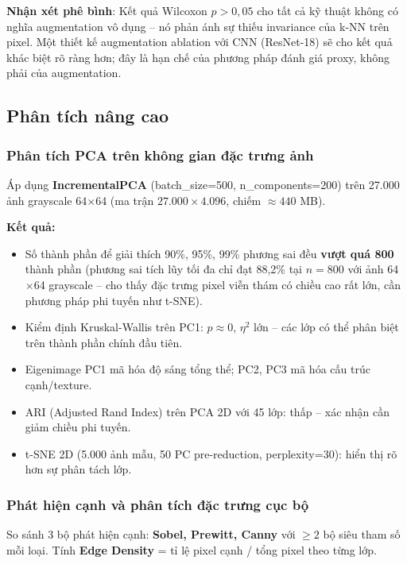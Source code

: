 \documentclass[12pt,a4paper]{article}
\let\oldtextbf\textbf
\renewcommand{\textbf}[1]{\oldtextbf{\textcolor{hcmublue}{#1}}}
\begin{document}
\textbf{Nhận xét phê bình}: Kết quả Wilcoxon $p > 0{,}05$ cho tất cả kỹ thuật không có nghĩa augmentation vô dụng -- nó phản ánh sự thiếu invariance của k-NN trên pixel. Một thiết kế augmentation ablation với CNN (ResNet-18) sẽ cho kết quả khác biệt rõ ràng hơn; đây là hạn chế của phương pháp đánh giá proxy, không phải của augmentation.

\subsection{Phân tích nâng cao}

\subsubsection{Phân tích PCA trên không gian đặc trưng ảnh}

Áp dụng \textbf{IncrementalPCA} (batch\_size=500, n\_components=200) trên 27.000 ảnh grayscale 64$\times$64 (ma trận $27.000 \times 4.096$, chiếm $\approx 440$ MB).

\textbf{Kết quả:}
\begin{itemize}
    \item Số thành phần để giải thích 90\%, 95\%, 99\% phương sai đều \textbf{vượt quá 800} thành phần (phương sai tích lũy tối đa chỉ đạt 88{,}2\% tại $n{=}800$ với ảnh 64$\times$64 grayscale -- cho thấy đặc trưng pixel viễn thám có chiều cao rất lớn, cần phương pháp phi tuyến như t-SNE).
    \item Kiểm định Kruskal-Wallis trên PC1: $p \approx 0$, $\eta^2$ lớn -- các lớp có thể phân biệt trên thành phần chính đầu tiên.
    \item Eigenimage PC1 mã hóa độ sáng tổng thể; PC2, PC3 mã hóa cấu trúc cạnh/texture.
    \item ARI (Adjusted Rand Index) trên PCA 2D với 45 lớp: thấp -- xác nhận cần giảm chiều phi tuyến.
    \item t-SNE 2D (5.000 ảnh mẫu, 50 PC pre-reduction, perplexity=30): hiển thị rõ hơn sự phân tách lớp.
\end{itemize}

\subsubsection{Phát hiện cạnh và phân tích đặc trưng cục bộ}

So sánh 3 bộ phát hiện cạnh: \textbf{Sobel, Prewitt, Canny} với $\geq 2$ bộ siêu tham số mỗi loại. Tính \textbf{Edge Density} = tỉ lệ pixel cạnh / tổng pixel theo từng lớp.
\end{document}
